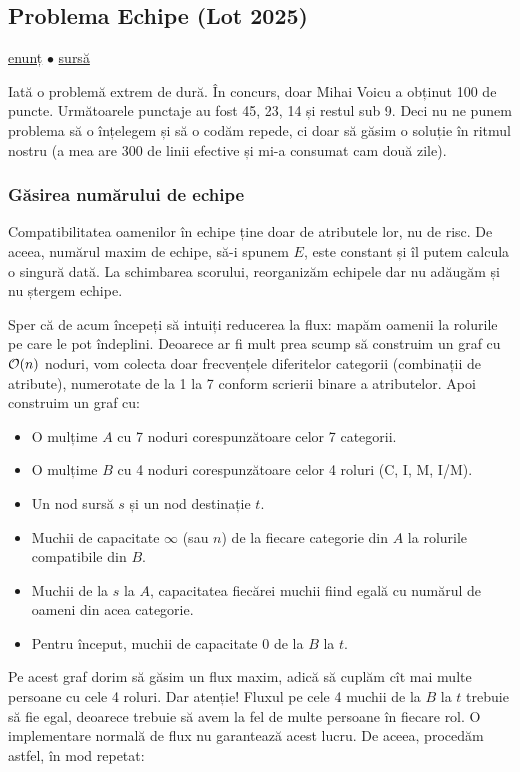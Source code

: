 \documentclass[../main.tex]{subfiles}
\begin{document}
\subsection{Problema Echipe (Lot 2025)}
\label{problem:echipe}

\href{https://kilonova.ro/problems/3792}{enunț}
$\bullet$
\hyperref[code:echipe]{sursă}

Iată o problemă extrem de dură. În concurs, doar Mihai Voicu a obținut 100 de puncte. Următoarele punctaje au fost 45, 23, 14 și restul sub 9. Deci nu ne punem problema să o înțelegem și să o codăm repede, ci doar să găsim o soluție în ritmul nostru (a mea are 300 de linii efective și mi-a consumat cam două zile).

\subsubsection*{Găsirea numărului de echipe}

Compatibilitatea oamenilor în echipe ține doar de atributele lor, nu de risc. De aceea, numărul maxim de echipe, să-i spunem $E$, este constant și îl putem calcula o singură dată. La schimbarea scorului, reorganizăm echipele dar nu adăugăm și nu ștergem echipe.

Sper că de acum începeți să intuiți reducerea la flux: mapăm oamenii la rolurile pe care le pot îndeplini. Deoarece ar fi mult prea scump să construim un graf cu $\mathcal{O}(n)$ noduri, vom colecta doar frecvențele diferitelor categorii (combinații de atribute), numerotate de la 1 la 7 conform scrierii binare a atributelor. Apoi construim un graf cu:

\begin{itemize}
  \item O mulțime $A$ cu 7 noduri corespunzătoare celor 7 categorii.
  \item O mulțime $B$ cu 4 noduri corespunzătoare celor 4 roluri (C, I, M, I/M).
  \item Un nod sursă $s$ și un nod destinație $t$.
  \item Muchii de capacitate $\infty$ (sau $n$) de la fiecare categorie din $A$ la rolurile compatibile din $B$.
  \item Muchii de la $s$ la $A$, capacitatea fiecărei muchii fiind egală cu numărul de oameni din acea categorie.
  \item Pentru început, muchii de capacitate 0 de la $B$ la $t$.
\end{itemize}

Pe acest graf dorim să găsim un flux maxim, adică să cuplăm cît mai multe persoane cu cele 4 roluri. Dar atenție! Fluxul pe cele 4 muchii de la $B$ la $t$ trebuie să fie egal, deoarece trebuie să avem la fel de multe persoane în fiecare rol. O implementare normală de flux nu garantează acest lucru. De aceea, procedăm astfel, în mod repetat:
\end{document}
